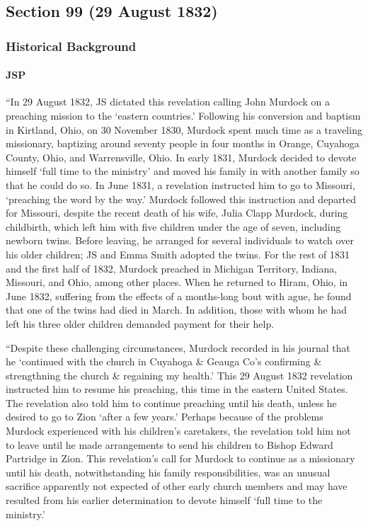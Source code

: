 \subsection{Section 99 (29 August 1832)}
	\label{DC99}
	
	\subsubsection{Historical Background}
		\label{DC99-HB}
		
		\paragraph{JSP}
		
			``In 29 August 1832, JS dictated this revelation calling John Murdock on a preaching mission to the `eastern countries.' Following his conversion and baptism in Kirtland, Ohio, on 30 November 1830, Murdock spent much time as a traveling missionary, baptizing around seventy people in four months in Orange, Cuyahoga County, Ohio, and Warrensville, Ohio. In early 1831, Murdock decided to devote himself `full time to the ministry' and moved his family in with another family so that he could do so. In June 1831, a revelation instructed him to go to Missouri, `preaching the word by the way.' Murdock followed this instruction and departed for Missouri, despite the recent death of his wife, Julia Clapp Murdock, during childbirth, which left him with five children under the age of seven, including newborn twins. Before leaving, he arranged for several individuals to watch over his older children; JS and Emma Smith adopted the twins. For the rest of 1831 and the first half of 1832, Murdock preached in Michigan Territory, Indiana, Missouri, and Ohio, among other places. When he returned to Hiram, Ohio, in June 1832, suffering from the effects of a months-long bout with ague, he found that one of the twins had died in March. In addition, those with whom he had left his three older children demanded payment for their help.
			
			``Despite these challenging circumstances, Murdock recorded in his journal that he `continued with the church in Cuyahoga \& Geauga Co's confirming \& strengthning the church \& regaining my health.' This 29 August 1832 revelation instructed him to resume his preaching, this time in the eastern United States. The revelation also told him to continue preaching until his death, unless he desired to go to Zion `after a few years.' Perhaps because of the problems Murdock experienced with his children's caretakers, the revelation told him not to leave until he made arrangements to send his children to Bishop Edward Partridge in Zion. This revelation's call for Murdock to continue as a missionary until his death, notwithstanding his family responsibilities, was an unusual sacrifice apparently not expected of other early church members and may have resulted from his earlier determination to devote himself `full time to the ministry.'
			

